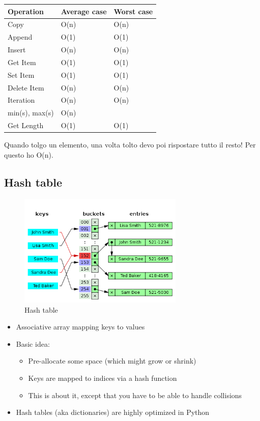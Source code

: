 \begin{center}

\begin{tabular}{lll}
    \hline
    Operation & Average case & Worst case\\
    \hline
    \hline
    Copy & O(n) & O(n)\\
    Append & O(1) & O(1)\\
    Insert & O(n) & O(n)\\
    Get Item & O(1) & O(1)\\
    Set Item & O(1) & O(1)\\
    Delete Item & O(n) & O(n)\\
    Iteration & O(n) & O(n)\\
    min(s), max(s) & O(n) & \\
    Get Length & O(1) & O(1)\\
    \hline
  \end{tabular}
\end{center}

Quando tolgo un elemento, una volta tolto devo poi rispostare tutto il resto! Per questo ho O(n).
\subsection{Hash table}



\begin{figure}[ht]
    \centering
    \includegraphics[width=0.7\textwidth]{lez3/hash.png}
    \caption{Hash table}
    \label{hash_table}
\end{figure}
\FloatBarrier

\begin{itemize}
  \item Associative array mapping keys to values
  \item Basic idea:
    \begin{itemize}
    \item Pre-allocate some space (which might grow or shrink)
    \item Keys are mapped to indices via a hash function
    \item This is about it, except that you have to be able to handle collisions
    \end{itemize}
  \item Hash tables (aka dictionaries) are highly optimized in Python
  \end{itemize}

